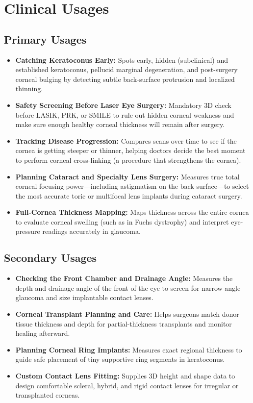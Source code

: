 \section{Clinical Usages}

\subsection{Primary Usages}
\begin{itemize}
    \item \textbf{Catching Keratoconus Early:} Spots early, hidden (subclinical) and established keratoconus, pellucid marginal degeneration, and post-surgery corneal bulging by detecting subtle back-surface protrusion and localized thinning.
    \item \textbf{Safety Screening Before Laser Eye Surgery:} Mandatory 3D check before LASIK, PRK, or SMILE to rule out hidden corneal weakness and make sure enough healthy corneal thickness will remain after surgery.
    \item \textbf{Tracking Disease Progression:} Compares scans over time to see if the cornea is getting steeper or thinner, helping doctors decide the best moment to perform corneal cross-linking (a procedure that strengthens the cornea).
    \item \textbf{Planning Cataract and Specialty Lens Surgery:} Measures true total corneal focusing power---including astigmatism on the back surface---to select the most accurate toric or multifocal lens implants during cataract surgery.
    \item \textbf{Full-Cornea Thickness Mapping:} Maps thickness across the entire cornea to evaluate corneal swelling (such as in Fuchs dystrophy) and interpret eye-pressure readings accurately in glaucoma.
\end{itemize}

\subsection{Secondary Usages}
\begin{itemize}
    \item \textbf{Checking the Front Chamber and Drainage Angle:} Measures the depth and drainage angle of the front of the eye to screen for narrow-angle glaucoma and size implantable contact lenses.
    \item \textbf{Corneal Transplant Planning and Care:} Helps surgeons match donor tissue thickness and depth for partial-thickness transplants and monitor healing afterward.
    \item \textbf{Planning Corneal Ring Implants:} Measures exact regional thickness to guide safe placement of tiny supportive ring segments in keratoconus.
    \item \textbf{Custom Contact Lens Fitting:} Supplies 3D height and shape data to design comfortable scleral, hybrid, and rigid contact lenses for irregular or transplanted corneas.
\end{itemize}

